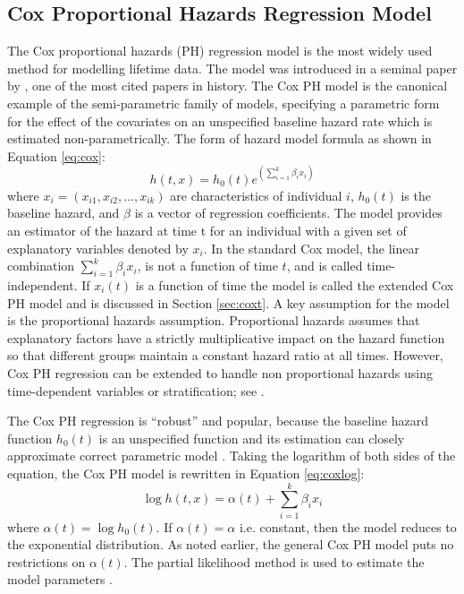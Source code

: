 \documentclass[12pt,letterpaper]{article}
\begin{document}
\subsection{Cox Proportional Hazards Regression Model} \label{Cox.mod}
The Cox proportional hazards (PH) regression model is the most widely used method for modelling lifetime data. The model was introduced in a seminal paper by \citet{cox1972}, one of the most cited papers in history. The Cox PH model is the canonical example of the semi-parametric family of models, specifying a parametric form for the effect of the covariates on an unspecified baseline hazard rate which is estimated non-parametrically.
The form of hazard model formula as shown in Equation \ref{eq:cox}:
\begin{equation}
	\label{eq:cox}
	h(t,x)=h_0(t)e^{(\sum_{i=1}^{k}\beta_ix_i)}
\end{equation}
where $x_i=(x_{i1}, x_{i2}, \ldots, x_{ik})$ are characteristics of individual $i$, $h_0(t)$ is the baseline hazard, and $\beta$  is a vector of regression coefficients.
The model provides an estimator of the hazard at time t for an individual with a given set of explanatory variables denoted by $x_i$.  In the standard Cox model, the linear combination $\sum_{i=1}^{k}\beta_i x_i$, is not a function of time $t$, and is called time-independent.  If $x_i(t)$ is a function of time the model is called the extended Cox PH model and is discussed in Section \ref{sec:coxt}. A key assumption for the model is the proportional hazards assumption. Proportional hazards assumes that explanatory factors have a strictly multiplicative impact on the hazard function so that different groups maintain a constant hazard ratio at all times. However, Cox PH regression can be extended to handle non proportional hazards using time-dependent variables or stratification; see \cite{kleinMosch2003}.

The Cox PH regression is \enquote{robust} and popular, because the baseline hazard function $h_0 (t)$ is an unspecified function and its estimation can closely approximate correct parametric model \citep{kleinbaum1998}. Taking the logarithm of both sides of the equation, the Cox PH model is rewritten in Equation \ref{eq:coxlog}:
\begin{equation}
	\label{eq:coxlog}
	\log{h(t,x)}=\alpha(t)+\sum_{i=1}^{k}\beta_ix_i
\end{equation}
where $\alpha(t)=\log{h_0(t)}$. If $\alpha(t)=\alpha$ i.e. constant, then the model reduces to the exponential distribution. As noted earlier, the general Cox PH model puts no restrictions on $\alpha(t)$.  The partial likelihood method is used to estimate the model parameters \citep{allison1995}. %
\end{document}
